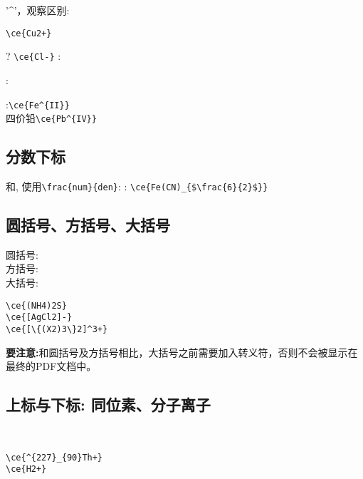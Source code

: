 \documentclass[UTF8, a4paper]{article}
\begin{document}
'\^{}'，观察区别:

\begin{minipage}{.3\textwidth}
\end{minipage}
\begin{minipage}{.7\textwidth}
	\verb|\ce{Cu2+}|
\end{minipage}

? \verb|\ce{Cl-}| : \newline

:

:\qquad \verb|\ce{Fe^{II}}|\\ 
四价铅\qquad \verb|\ce{Pb^{IV}}|

\subsection{分数下标}
和, 使用\verb|\frac{num}{den}|: 
: \verb|\ce{Fe(CN)_{$\frac{6}{2}$}}|

\subsection{圆括号、方括号、大括号}
\begin{minipage}{.3\textwidth}
	圆括号:\\
	方括号:\ce{[AgCl2]-}\\
	大括号:
\end{minipage}
\begin{minipage}{.7\textwidth}
	\verb|\ce{(NH4)2S}|\\
	\verb|\ce{[AgCl2]-}|\\
	\verb|\ce{[\{(X2)3\}2]^3+}|
\end{minipage}

\textbf{要注意:}和圆括号及方括号相比，大括号之前需要加入转义符，否则不会被显示在最终的PDF文档中。
\subsection{上标与下标: 同位素、分子离子}
\begin{minipage}{.3\textwidth}
	\\
\end{minipage}
\begin{minipage}{.7\textwidth}
	\verb|\ce{^{227}_{90}Th+}|\\
	\verb|\ce{H2+}|
\end{minipage}
\end{document}

